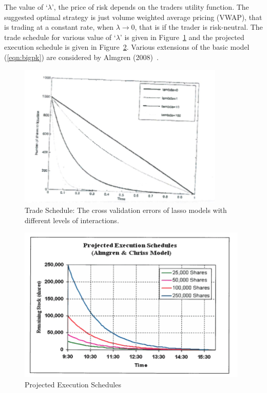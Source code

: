 The value of `$\lambda$', the price of risk depends on the traders utility function. The suggested optimal strategy is just volume weighted average pricing (VWAP), that is trading at a constant rate, when $\lambda \to 0$, that is if the trader is risk-neutral. The trade schedule for various value of `$\lambda$' is given in Figure~\ref{fig:7first} and the projected execution schedule is given in Figure~\ref{fig:7second}. Various extensions of the basic model (\ref{eqn:bigpk}) are considered by Almgren (2008)~\cite{alm2008}.
	\begin{figure}[!ht]
   	\centering
	    \includegraphics[width=\textwidth]{chapters/chapter_exec_models/figures/temp1.png}
	   \caption{Trade Schedule: The cross validation errors of lasso models with different levels of interactions.\label{fig:7first}}
	\end{figure}
	\begin{figure}[!ht]
	   \centering
	    \includegraphics[width=\textwidth]{chapters/chapter_exec_models/figures/temp2.png}
	   \caption{Projected Execution Schedules \label{fig:7second}}
	\end{figure}
